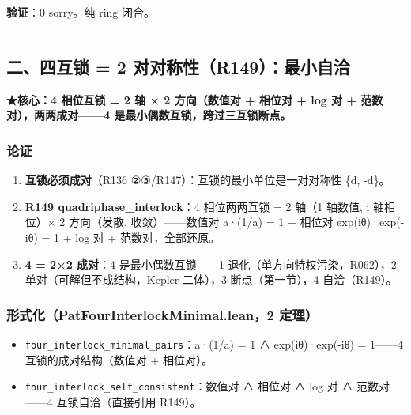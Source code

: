 \documentclass[
]{article}
\providecommand{\tightlist}{%
  \setlength{\itemsep}{0pt}\setlength{\parskip}{0pt}}
\begin{document}
\textbf{验证}：0 sorry。纯 ring 闭合。

\begin{center}\rule{0.5\linewidth}{0.5pt}\end{center}

\subsection{二、四互锁 = 2
对对称性（R149）：最小自洽}\label{ux4e8cux56dbux4e92ux9501-2-ux5bf9ux5bf9ux79f0ux6027r149ux6700ux5c0fux81eaux6d3d}

\textbf{★核心：4 相位互锁 = 2 轴 × 2 方向（数值对 + 相位对 + log 对 +
范数对），两两成对------4 是最小偶数互锁，跨过三互锁断点。}

\subsubsection{论证}\label{ux8bbaux8bc1-1}

\begin{enumerate}
\def\labelenumi{\arabic{enumi}.}
\tightlist
\item
  \textbf{互锁必须成对}（R136 ②③/R147）：互锁的最小单位是一对对称性 \{d,
  -d\}。
\item
  \textbf{R149 quadriphase\_interlock}：4 相位两两互锁 = 2 轴（1 轴数值,
  i 轴相位）× 2 方向（发散, 收敛）------数值对 a·(1/a) = 1 + 相位对
  exp(iθ)·exp(-iθ) = 1 + log 对 + 范数对，全部还原。
\item
  \textbf{4 = 2×2 成对}：4 是最小偶数互锁------1
  退化（单方向特权污染，R062），2 单对（可解但不成结构，Kepler 二体），3
  断点（第一节），4 自洽（R149）。
\end{enumerate}

\subsubsection{形式化（PatFourInterlockMinimal.lean，2
定理）}\label{ux5f62ux5f0fux5316patfourinterlockminimal.lean2-ux5b9aux7406-1}

\begin{itemize}
\tightlist
\item
  \texttt{four\_interlock\_minimal\_pairs}：a·(1/a) = 1 ∧
  exp(iθ)·exp(-iθ) = 1------4 互锁的成对结构（数值对 + 相位对）。
\item
  \texttt{four\_interlock\_self\_consistent}：数值对 ∧ 相位对 ∧ log 对 ∧
  范数对------4 互锁自洽（直接引用 R149）。
\end{itemize}
\end{document}
